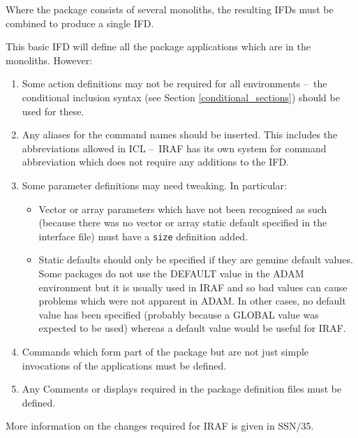 \documentclass[twoside,11pt]{article}
\newcommand{\htmlref}[2]{#1}
\newcommand{\xref}[3]{#1}
\newcommand{\latex}[1]{#1}
\newcommand{\dash}{--}
\newcommand{\dash}{-}
\begin{document}
Where the package consists of several monoliths, the resulting IFDs must be
combined to produce a single IFD.

This basic IFD will define all the package applications which are in the
monoliths. However:
\begin{enumerate}
\item Some action definitions may not be required for all environments
\dash\ the
\htmlref{conditional inclusion}{conditional_sections}
syntax
\latex{(see Section \ref{conditional_sections})} should be used for these.
\item Any
\htmlref{aliases}{alias}
for the command names should be inserted. This includes the abbreviations
allowed in
\xref{ICL}{sg5}{} \dash\ IRAF has its own system for command abbreviation which
does not require any additions to the IFD.
\item Some parameter definitions may need tweaking. In particular:
\begin{itemize}
\item Vector or array parameters which have not been recognised as such
(because there was no vector or array static default specified in the
interface file) must have a
\htmlref{\texttt{size}}{size}
definition added.
\item Static defaults should only be specified if they are genuine default
values. Some packages do not use the DEFAULT value in the ADAM environment
but it is usually used in IRAF and so bad values can cause problems which
were not apparent in ADAM. In other cases, no default value has been
specified (probably because a GLOBAL value was expected to be used) whereas
a default value would be useful for IRAF.
\end{itemize}
\item Commands which form part of the package but are not just simple
invocations of the applications must be defined.
\item Any
\htmlref{Comments}{comment}
or
\htmlref{displays}{display}
required in the package definition files must be defined.
\end{enumerate}
More information on the changes required for IRAF is given in
\xref{SSN/35}{ssn35}{}.
\end{document}
